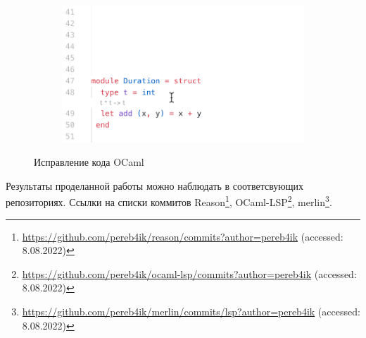 \begin{figure}[h]
\begin{subfigure}{0.5\textwidth}
\end{subfigure}
\begin{subfigure}{0.5\textwidth}
	\includegraphics[width=\linewidth]{screenshots/04.png}
\end{subfigure}
\caption{Исправление кода OCaml}
	\label{fix}%
\end{figure}

Результаты проделанной работы можно наблюдать в соответсвующих репозиториях. Ссылки на списки коммитов Reason\footnote{ \url{https://github.com/pereb4ik/reason/commits?author=pereb4ik} (accessed: 8.08.2022) },
OCaml-LSP\footnote{ \url{https://github.com/pereb4ik/ocaml-lsp/commits?author=pereb4ik} (accessed: 8.08.2022) },
merlin\footnote{ \url{https://github.com/pereb4ik/merlin/commits/lsp?author=pereb4ik} (accessed: 8.08.2022) }.
\newpage

